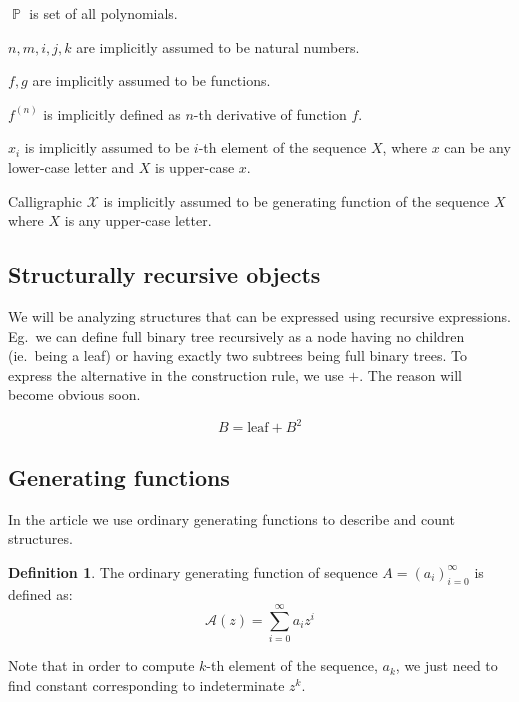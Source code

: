 \documentclass[final]{article}
\theoremstyle{definition}
\newtheorem{definition}{Definition}[subsection]
\theoremstyle{remark}
\newcommand{\gf}[1]{\ensuremath{\mathcal{#1}}}
\DeclareMathOperator{\poly}{\mathbb{P}}
\begin{document}
\(\poly\) is set of all polynomials.

\(n, m, i, j, k\) are implicitly assumed to be natural numbers.

\(f, g\) are implicitly assumed to be functions.

\(f^{(n)}\) is implicitly defined as \(n\)-th derivative of function \(f\).

\(x_i\) is implicitly assumed to be \(i\)-th element of the sequence \(X\), where \(x\) can be any lower-case letter and \(X\) is upper-case \(x\).

Calligraphic \(\gf{X}\) is implicitly assumed to be generating function of the sequence \(X\) where \(X\) is any upper-case letter.

\subsection{Structurally recursive objects}

We will be analyzing structures that can be expressed using recursive expressions. Eg.\ we can define full binary tree recursively as a node having no children (ie.\ being a leaf) or having exactly two subtrees being full binary trees. To express the alternative in the construction rule, we use \(+\). The reason will become obvious soon.

\[B = \text{leaf} + B^2\]


\subsection{Generating functions}

In the article we use ordinary generating functions to describe and count structures.

\begin{definition}
The ordinary generating function of sequence \(A = (a_i)_{i=0}^{\infty}\) is defined as:
\[\gf{A}(z) = \sum_{i=0}^{\infty} a_i z^i\]
\end{definition}

Note that in order to compute \(k\)-th element of the sequence, \(a_k\), we just need to find constant corresponding to indeterminate \(z^k\).
\end{document}
